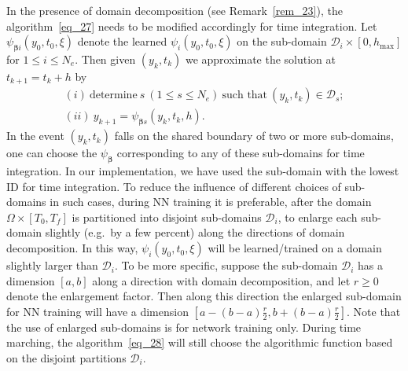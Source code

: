 \begin{remark}\label{rem_26}
  In the presence of domain decomposition (see Remark~\ref{rem_23}),
  the algorithm~\eqref{eq_27} needs to be modified accordingly for time
  integration. Let $\psi_{\bm\beta i}(y_0,t_0,\xi)$ 
  denote the learned $\psi_i(y_0,t_0,\xi)$ on
  the sub-domain $\mathcal{D}_i\times [0,h_{\max}]$
  for $1\leqslant i\leqslant N_e$. Then given
  $(y_k,t_k)$ we approximate the solution at 
  $t_{k+1}=t_k+h$ by
  \begin{equation}\label{eq_28}
    \begin{array}{l}
      (i)\ \text{determine}\ s\ (1\leqslant s\leqslant N_e)\
      \text{such that}\ (y_k,t_k)\in\mathcal{D}_s; \\
      (ii)\ y_{k+1} = \psi_{\bm\beta s}(y_k,t_k,h).
    \end{array}
  \end{equation}
  In the event $(y_k,t_k)$ falls on the shared
  boundary of two or more sub-domains, one can choose
  the $\psi_{\bm\beta}$ corresponding to any of these sub-domains
  for time integration. In our implementation, we have
  used the sub-domain with the lowest ID 
  for time integration.
  To reduce the influence of different choices of sub-domains
  in such cases, during NN training it is preferable, after
  the domain $\Omega\times[T_0,T_f]$ is partitioned into disjoint
  sub-domains $\mathcal{D}_i$,
  to enlarge each sub-domain slightly (e.g.~by a few percent)
  along the directions of domain decomposition.
  In this way, $\psi_i(y_0,t_0,\xi)$ will be learned/trained on
  a domain slightly larger than $\mathcal{D}_i$.
  To be more specific, suppose the sub-domain $\mathcal{D}_i$ has a dimension $[a,b]$
  along a direction with domain decomposition,
  and let $r\geqslant 0$ denote the enlargement
  factor. Then along this direction the enlarged sub-domain for NN training
  will have a dimension $\left[a-(b-a)\frac{r}{2}, b+(b-a)\frac{r}{2}\right]$.
  Note that the use of enlarged sub-domains is 
  for network training only. During time marching,
  the algorithm~\eqref{eq_28} will still choose the algorithmic
  function based on the disjoint partitions $\mathcal{D}_i$.
  

\end{remark}


